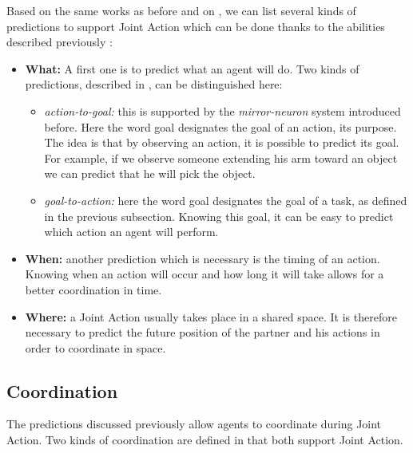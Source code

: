 \documentclass[english,a4paper,11pt,twoside]{StyleThese}
\begin{document}
\bigskip
Based on the same works as before and on \cite{sebanz2009prediction}, we can list several kinds of predictions to support Joint Action which can be done thanks to the abilities described previously :

\begin{itemize}
\item \textbf{What:} A first one is to predict what an agent will do. Two kinds of predictions, described in \cite{pacherie2011phenomenology}, can be distinguished here:
\begin{itemize}
\item \textit{action-to-goal:} this is supported by the \textit{mirror-neuron} system introduced before. Here the word goal designates the goal of an action, its purpose. The idea is that by observing an action, it is possible to predict its goal. For example, if we observe someone extending his arm toward an object we can predict that he will pick the object.
\item \textit{goal-to-action:} here the word goal designates the goal of a task, as defined in the previous subsection. Knowing this goal, it can be easy to predict which action an agent will perform.
\end{itemize}
\item \textbf{When:} another prediction which is necessary is the timing of an action. Knowing when an action will occur and how long it will take allows for a better coordination in time.
\item \textbf{Where:} a Joint Action usually takes place in a shared space. It is therefore necessary to predict the future position of the partner and his actions in order to coordinate in space.
\end{itemize} 


\subsection{Coordination}

\label{subsec:coordination}

The predictions discussed previously allow agents to coordinate during Joint Action. Two kinds of coordination are defined in \cite{knoblich20113} that both support Joint Action.
\end{document}
